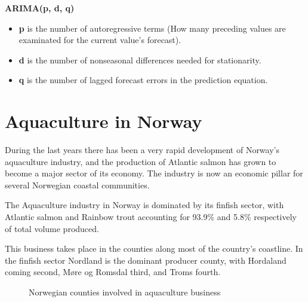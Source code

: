 \textbf{ARIMA(p, d, q)}
  \vspace{-5mm}
\begin{itemize}
 \setlength{\itemsep}{-5pt}
\item \textbf{p} is the number of autoregressive terms (How many preceding values are examinated for the current value’s forecast).

\item \textbf{d} is the number of nonseasonal differences needed for stationarity.

\item \textbf{q} is the number of lagged forecast errors in the prediction equation. 
\end{itemize}

\newpage

\section{Aquaculture in Norway}
\vspace{-5mm}
During the last years there has been a very rapid development of Norway's aquaculture industry, and the production of Atlantic salmon has grown to become a major sector of its economy. The industry is now an economic pillar for several Norwegian coastal communities.\cite{SenCanada}

The Aquaculture industry in Norway is dominated by its finfish sector, with Atlantic salmon and Rainbow trout accounting for 93.9\% and 5.8\% respectively of total volume produced.

This business takes place in the counties along most of the country's coastline. In the finfish sector Nordland is the dominant producer county, with Hordaland coming second, Møre og Romsdal third, and Troms fourth.

\begin{figure}[h]
    \caption[Norwegian counties involved in aquaculture business]{Norwegian counties involved in aquaculture business}
    \label{fig: Norway_Counties}
\end{figure}